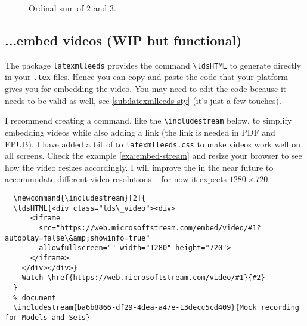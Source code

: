 \documentclass[a4paper]{article}
\def\ltxinline{\lstinline[style=latexml]}
\theoremstyle{definition}
\begin{document}
\begin{figure}
  \begin{center}
  \end{center}
  \caption{Ordinal sum of $2$ and $3$.}
  \label{fig:tikz-example}
\end{figure}

\subsection{...embed videos (WIP but functional)}
The package \verb|latexmlleeds| provides the command \ltxinline|\ldsHTML| to generate \HTML{} directly in your \verb|.tex| files. Hence you can copy and paste the \HTML{} code that your platform gives you for embedding the video. You may need to edit the \HTML{} code because it needs to be valid \XML{} as well, see \autoref{sub:latexmlleeds-sty} (it's just a few touches).

I recommend creating a command, like the \ltxinline|\includestream| below, to simplify embedding videos while also adding a link (the link is needed in PDF and EPUB). I have added a bit of \CSS{} to \verb|latexmlleeds.css| to make videos work well on all screens. Check the example \autoref{exa:embed-stream} and resize your browser to see how the video resizes accordingly. I will improve the \CSS{} in the near future to accommodate different video resolutions -- for now it expects $1280 \times 720$.
\begin{lstlisting}[style=latexml]
  % preamble
  \newcommand{\includestream}[2]{
  \ldsHTML{<div class="lds\_video"><div>
      <iframe
        src="https://web.microsoftstream.com/embed/video/#1?autoplay=false\&amp;showinfo=true"
        allowfullscreen="" width="1280" height="720">
      </iframe>
    </div></div>}
    Watch \href{https://web.microsoftstream.com/video/#1}{#2}
  }
  % document
  \includestream{ba6b8866-df29-4dea-a47e-13decc5cd409}{Mock recording for Models and Sets}
\end{lstlisting}
\end{document}
